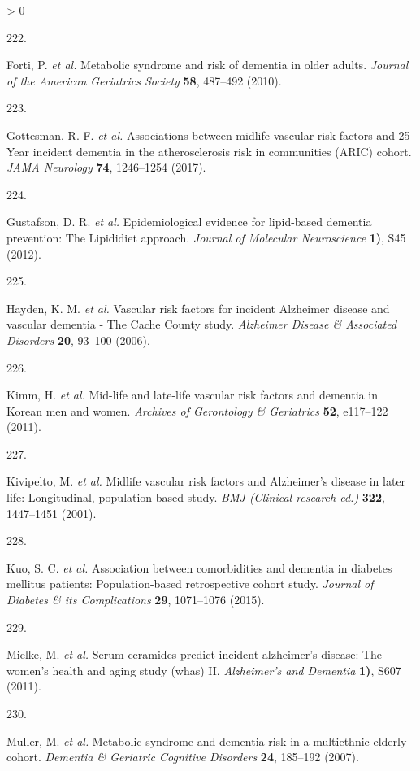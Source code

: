 \documentclass[a4paper, twoside]{templates/ociamthesis}
\newlength{\cslhangindent}
\newlength{\csllabelwidth}
\newenvironment{CSLReferences}[3] %
 {%
  \setlength{\parindent}{0pt}
  \ifodd #1 \everypar{\setlength{\hangindent}{\cslhangindent}}\ignorespaces\fi
  \ifnum #2 > 0
  \setlength{\parskip}{#2\baselineskip}
  \fi
 }%
 {}
\newcommand{\CSLLeftMargin}[1]{\parbox[t]{\maxof{\widthof{#1}}{\csllabelwidth}}{#1}}
\newcommand{\CSLRightInline}[1]{\parbox[t]{\linewidth - \csllabelwidth}{#1}}
\begin{document}
\begin{CSLReferences}{0}{0}
\leavevmode\hypertarget{ref-forti2010}{}%
\CSLLeftMargin{222. }
\CSLRightInline{Forti, P. \emph{et al.} Metabolic syndrome and risk of dementia in older adults. \emph{Journal of the American Geriatrics Society} \textbf{58}, 487--492 (2010).}

\leavevmode\hypertarget{ref-gottesman2017}{}%
\CSLLeftMargin{223. }
\CSLRightInline{Gottesman, R. F. \emph{et al.} Associations between midlife vascular risk factors and 25-{Year} incident dementia in the atherosclerosis risk in communities ({ARIC}) cohort. \emph{JAMA Neurology} \textbf{74}, 1246--1254 (2017).}

\leavevmode\hypertarget{ref-gustafson2012}{}%
\CSLLeftMargin{224. }
\CSLRightInline{Gustafson, D. R. \emph{et al.} Epidemiological evidence for lipid-based dementia prevention: The {Lipididiet} approach. \emph{Journal of Molecular Neuroscience} \textbf{1)}, S45 (2012).}

\leavevmode\hypertarget{ref-hayden2006}{}%
\CSLLeftMargin{225. }
\CSLRightInline{Hayden, K. M. \emph{et al.} Vascular risk factors for incident {Alzheimer} disease and vascular dementia - {The Cache County} study. \emph{Alzheimer Disease \& Associated Disorders} \textbf{20}, 93--100 (2006).}

\leavevmode\hypertarget{ref-kimm2011}{}%
\CSLLeftMargin{226. }
\CSLRightInline{Kimm, H. \emph{et al.} Mid-life and late-life vascular risk factors and dementia in {Korean} men and women. \emph{Archives of Gerontology \& Geriatrics} \textbf{52}, e117--122 (2011).}

\leavevmode\hypertarget{ref-kivipelto2001}{}%
\CSLLeftMargin{227. }
\CSLRightInline{Kivipelto, M. \emph{et al.} Midlife vascular risk factors and {Alzheimer}'s disease in later life: Longitudinal, population based study. \emph{BMJ (Clinical research ed.)} \textbf{322}, 1447--1451 (2001).}

\leavevmode\hypertarget{ref-kuo2015}{}%
\CSLLeftMargin{228. }
\CSLRightInline{Kuo, S. C. \emph{et al.} Association between comorbidities and dementia in diabetes mellitus patients: Population-based retrospective cohort study. \emph{Journal of Diabetes \& its Complications} \textbf{29}, 1071--1076 (2015).}

\leavevmode\hypertarget{ref-mielke2011}{}%
\CSLLeftMargin{229. }
\CSLRightInline{Mielke, M. \emph{et al.} Serum ceramides predict incident alzheimer's disease: The women's health and aging study (whas) {II}. \emph{Alzheimer's and Dementia} \textbf{1)}, S607 (2011).}

\leavevmode\hypertarget{ref-muller2007}{}%
\CSLLeftMargin{230. }
\CSLRightInline{Muller, M. \emph{et al.} Metabolic syndrome and dementia risk in a multiethnic elderly cohort. \emph{Dementia \& Geriatric Cognitive Disorders} \textbf{24}, 185--192 (2007).}


\end{CSLReferences}
\end{document}
